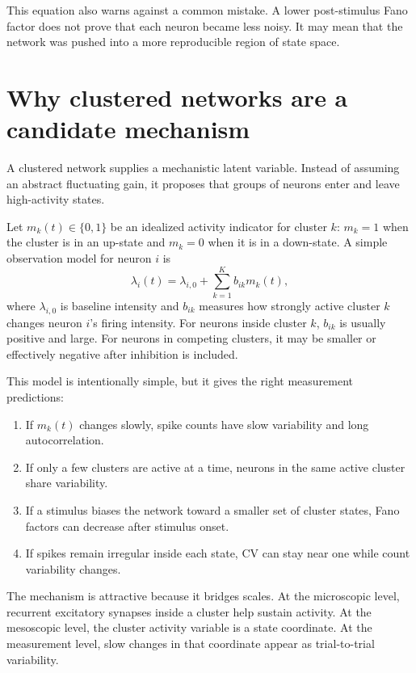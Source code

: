 This equation also warns against a common mistake. A lower post-stimulus Fano factor does not prove that each neuron became less noisy. It may mean that the network was pushed into a more reproducible region of state space.

\section{Why clustered networks are a candidate mechanism}
\label{sec:why-clustered-networks-candidate-mechanism}

A clustered network supplies a mechanistic latent variable. Instead of assuming an abstract fluctuating gain, it proposes that groups of neurons enter and leave high-activity states.

Let $m_k(t)\in\{0,1\}$ be an idealized activity indicator for cluster $k$: $m_k=1$ when the cluster is in an up-state and $m_k=0$ when it is in a down-state. A simple observation model for neuron $i$ is
%
\begin{equation}
  \lambda_i(t)
  =
  \lambda_{i,0}
  +
  \sum_{k=1}^K b_{ik}m_k(t),
  \label{eq:cluster-latent-rate-model}
\end{equation}
%
where $\lambda_{i,0}$ is baseline intensity and $b_{ik}$ measures how strongly active cluster $k$ changes neuron $i$'s firing intensity. For neurons inside cluster $k$, $b_{ik}$ is usually positive and large. For neurons in competing clusters, it may be smaller or effectively negative after inhibition is included.

This model is intentionally simple, but it gives the right measurement predictions:
%
\begin{enumerate}[leftmargin=*]
  \item If $m_k(t)$ changes slowly, spike counts have slow variability and long autocorrelation.
  \item If only a few clusters are active at a time, neurons in the same active cluster share variability.
  \item If a stimulus biases the network toward a smaller set of cluster states, Fano factors can decrease after stimulus onset.
  \item If spikes remain irregular inside each state, CV can stay near one while count variability changes.
\end{enumerate}

The mechanism is attractive because it bridges scales. At the microscopic level, recurrent excitatory synapses inside a cluster help sustain activity. At the mesoscopic level, the cluster activity variable is a state coordinate. At the measurement level, slow changes in that coordinate appear as trial-to-trial variability.

